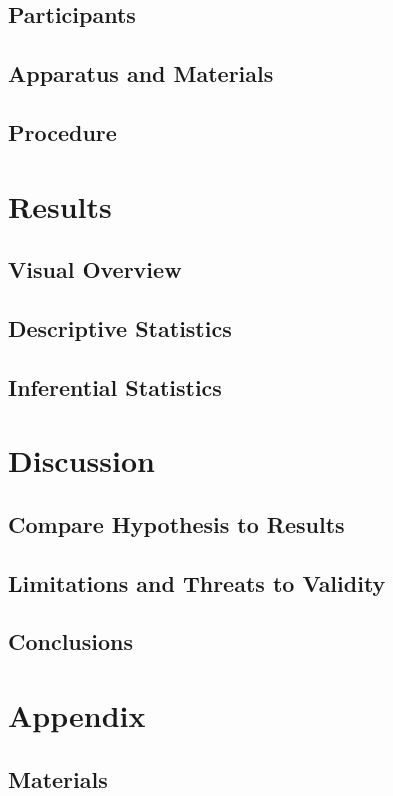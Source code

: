\documentclass{article}
\begin{document}
\subsection{Participants}

\subsection{Apparatus and Materials}


\subsection{Procedure}

\newpage

\section{Results}
\subsection{Visual Overview}


\subsection{Descriptive Statistics}


\subsection{Inferential Statistics}

\clearpage
\newpage

\section{Discussion}
\subsection{Compare Hypothesis to Results}


\subsection{Limitations and Threats to Validity}


\subsection{Conclusions}

\newpage

\section{Appendix}\label{chap:appendix}
\subsection{Materials}
\end{document}
